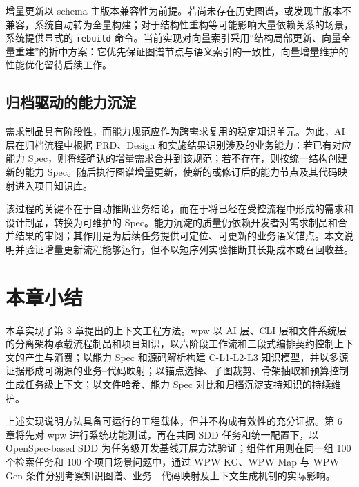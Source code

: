 增量更新以 schema 主版本兼容性为前提。若尚未存在历史图谱，或发现主版本不兼容，系统自动转为全量构建；对于结构性重构等可能影响大量依赖关系的场景，系统提供显式的 \texttt{rebuild} 命令。当前实现对向量索引采用“结构局部更新、向量全量重建”的折中方案：它优先保证图谱节点与语义索引的一致性，向量增量维护的性能优化留待后续工作。


\subsection{归档驱动的能力沉淀}
需求制品具有阶段性，而能力规范应作为跨需求复用的稳定知识单元。为此，AI 层在归档流程中根据 PRD、Design 和实施结果识别涉及的业务能力：若已有对应能力 Spec，则将经确认的增量需求合并到该规范；若不存在，则按统一结构创建新的能力 Spec。随后执行图谱增量更新，使新的或修订后的能力节点及其代码映射进入项目知识库。

该过程的关键不在于自动推断业务结论，而在于将已经在受控流程中形成的需求和设计制品，转换为可维护的 Spec。能力沉淀的质量仍依赖开发者对需求制品和合并结果的审阅；其作用是为后续任务提供可定位、可更新的业务语义锚点。本文说明并验证增量更新流程能够运行，但不以短序列实验推断其长期成本或召回收益。


\section{本章小结}
本章实现了第 3 章提出的上下文工程方法。wpw 以 AI 层、CLI 层和文件系统层的分离架构承载流程制品和项目知识，以六阶段工作流和三段式编排契约控制上下文的产生与消费；以能力 Spec 和源码解析构建 C-L1-L2-L3 知识模型，并以多源证据形成可溯源的业务--代码映射；以锚点选择、子图裁剪、骨架抽取和预算控制生成任务级上下文；以文件哈希、能力 Spec 对比和归档沉淀支持知识的持续维护。

上述实现说明方法具备可运行的工程载体，但并不构成有效性的充分证据。第 6 章将先对 wpw 进行系统功能测试，再在共同 SDD 任务和统一配置下，以 OpenSpec-based SDD 为任务级开发基线开展方法验证；组件作用则在同一组 100 个检索任务和 100 个项目场景问题中，通过 WPW-KG、WPW-Map 与 WPW-Gen 条件分别考察知识图谱、业务—代码映射及上下文生成机制的实际影响。
